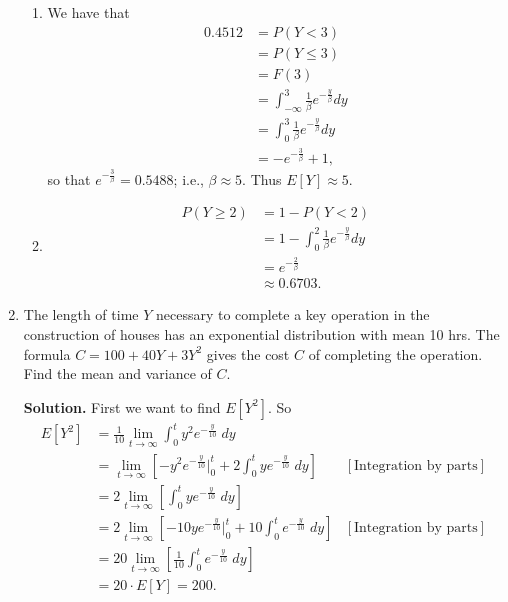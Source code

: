 \documentclass[9pt]{article}
\begin{document}
\begin{enumerate}
      \begin{enumerate}
         \item We have that
               \begin{align*}
                  0.4512 &= P(Y < 3) \\
                         &= P(Y \le 3) \\
                         &= F(3) \\
                         &= \int_{-\infty}^3\frac{1}{\beta}
                            e^{-\frac{y}{\beta}} dy \\
                         &= \int_0^3\frac{1}{\beta}
                            e^{-\frac{y}{\beta}} dy \\
                         &= -e^{-\frac{3}{\beta}} + 1,
               \end{align*}
               so that $e^{-\frac{3}{\beta}} = 0.5488$; i.e., $\beta \approx 5$.
               Thus $E[Y] \approx 5$.
         \item \begin{align*}
                  P(Y \ge 2) &= 1 - P(Y < 2) \\
                     &= 1 - \int_0^2\frac{1}{\beta}e^{-\frac{y}{\beta}} dy \\
                     &= e^{-\frac{2}{\beta}} \\
                     &\approx 0.6703.
               \end{align*}
      \end{enumerate}
   \item The length of time $Y$ necessary to complete a key operation in the
         construction of houses has an exponential distribution with mean 10
         hrs. The formula $C = 100 + 40Y + 3Y^2$ gives the cost $C$ of
         completing the operation. Find the mean and variance of $C$.
      
      \textbf{Solution.} First we want to find $E[Y^2]$. So
      \begin{align*}
         E[Y^2] &= \frac{1}{10}\lim_{t\rightarrow\infty}\int_0^t y^2
                   e^{-\frac{y}{10}}\;dy \\
            &= \lim_{t\rightarrow\infty}\left[-y^2e^{-\frac{y}{10}}\Big|_0^t +
               2\int_0^t y e^{-\frac{y}{10}}\;dy\right]
               &[\text{Integration by parts}] \\
            &= 2\lim_{t\rightarrow\infty}\left[\int_0^t y e^{-\frac{y}{10}}\;dy
               \right] \\
            &= 2\lim_{t\rightarrow\infty}\left[-10ye^{-\frac{y}{10}}\Big|_0^t +
               10\int_0^t e^{-\frac{y}{10}}\;dy
               \right] &[\text{Integration by parts}] \\
            &= 20\lim_{t\rightarrow\infty}\left[\frac{1}{10}\int_0^t
               e^{-\frac{y}{10}}\;dy \right] \\
            &= 20 \cdot E[Y] = 200.
      \end{align*}         


\end{enumerate}
\end{document}
